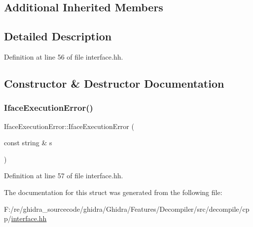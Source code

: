 \subsection*{Additional Inherited Members}


\subsection{Detailed Description}


Definition at line 56 of file interface.\+hh.



\subsection{Constructor \& Destructor Documentation}
\mbox{\label{struct_iface_execution_error_a69ff3ef464f81b1cf0c3b4dc33b73ae7}} 
\subsubsection{\texorpdfstring{IfaceExecutionError()}{IfaceExecutionError()}}
{\footnotesize\ttfamily Iface\+Execution\+Error\+::\+Iface\+Execution\+Error (\begin{DoxyParamCaption}\item[{const string \&}]{s }\end{DoxyParamCaption})\hspace{0.3cm}{\ttfamily [inline]}}



Definition at line 57 of file interface.\+hh.



The documentation for this struct was generated from the following file\+:\begin{DoxyCompactItemize}
\item 
F\+:/re/ghidra\+\_\+sourcecode/ghidra/\+Ghidra/\+Features/\+Decompiler/src/decompile/cpp/\mbox{\hyperlink{interface_8hh}{interface.\+hh}}\end{DoxyCompactItemize}
